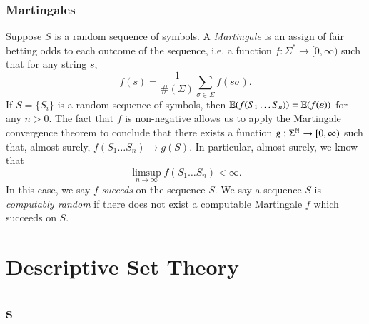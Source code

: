 \section{Martingales}

Suppose $S$ is a random sequence of symbols. A \emph{Martingale} is an assign of fair betting odds to each outcome of the sequence, i.e. a function $f: \Sigma^* \to [0,\infty)$ such that for any string $s$,
%
\[ f(s) = \frac{1}{\#(\Sigma)} \sum_{\sigma \in \Sigma} f(s \sigma). \]
%
If $S = \{ S_i \}$ is a random sequence of symbols, then $\operatorname{\mathbb{E}}(f(S_1 \dots S_n)) = \operatorname{\mathbb{E}}(f(\varepsilon))$ for any $n > 0$. The fact that $f$ is non-negative allows us to apply the Martingale convergence theorem to conclude that there exists a function $g: \Sigma^{\operatorname{\mathbb{N}}} \to [0,\infty)$ such that, almost surely, $f(S_1 \dots S_n) \to g(S)$. In particular, almost surely, we know that
%
\[ \limsup_{n \to \infty} f(S_1 \dots S_n) < \infty. \]
%
In this case, we say $f$ \emph{suceeds} on the sequence $S$. We say a sequence $S$ is \emph{computably random} if there does not exist a computable Martingale $f$ which succeeds on $S$.










\part{Descriptive Set Theory}

\chapter{s}

